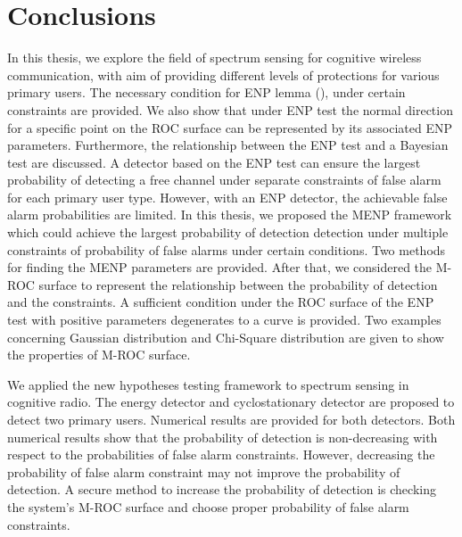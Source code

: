 \chapter{Conclusions}
In this thesis, we explore the field of spectrum sensing for cognitive wireless communication, with aim of providing different levels of protections for various primary users. The necessary condition for ENP lemma (), under certain constraints are provided. We also show that under ENP test the normal direction for a specific point on the ROC surface can be represented by its associated ENP parameters. Furthermore, the relationship between the ENP test and a Bayesian test are discussed. 
A detector based on the ENP test can ensure the largest probability of detecting a free channel under separate constraints of false alarm  for each primary user type. However, with an ENP detector, the achievable false alarm probabilities are limited.  
In this thesis, we proposed the MENP framework which could achieve the largest probability of detection detection under multiple constraints of probability of false alarms under certain conditions. Two methods for finding the MENP parameters are provided. 
After that, we considered the M-ROC surface to represent the relationship between the probability of detection and the constraints. A sufficient condition under the ROC surface of the ENP test with positive parameters degenerates to a curve is provided.  Two examples concerning Gaussian distribution and Chi-Square distribution are given to show the properties of M-ROC surface.

We applied the new hypotheses testing framework to spectrum sensing in cognitive radio. The energy detector and cyclostationary detector are proposed to detect two primary users. Numerical results are provided for both detectors. 
Both numerical results show that the probability of detection is non-decreasing with respect to the probabilities of false alarm constraints. However, decreasing the probability of false alarm constraint may not improve the probability of detection. A secure method to increase the probability of detection is checking the system's M-ROC surface and choose  proper probability of false alarm constraints.  

